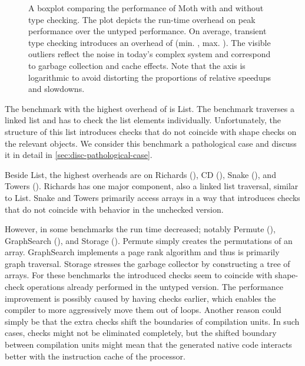 \begin{figure}[htb]
  \centering
	\TypingOverhead{}
	\caption{A boxplot comparing the performance of Moth
  with and without type checking.
  The plot depicts the run-time overhead on peak performance over
  the untyped performance. On average, transient type checking introduces
  an overhead of \OverheadTypingGMeanP (min. \OverheadTypingMinP, max. \OverheadTypingMaxP).
  The visible outliers reflect the noise in today's complex system
  and correspond \eg to garbage collection and cache effects.
  Note that the axis is logarithmic to avoid distorting the proportions
  of relative speedups and slowdowns.}
	\label{fig:typing-overhead}
\end{figure}


The benchmark with the highest overhead of \OverheadListP is List.
The benchmark traverses a linked list and
has to check the list elements individually.
Unfortunately, the structure of this list introduces checks
that do not coincide with shape checks on the relevant objects.
We consider this benchmark a pathological case and discuss it
in detail in \cref{sec:disc-pathological-case}.

Beside List, the highest overheads are on
Richards (\OverheadRichardsP), CD (\OverheadCDP), 
Snake (\OverheadSnakeP), and Towers (\OverheadTowersP).
Richards has one major component, also a linked list traversal,
similar to List.
Snake and Towers primarily access arrays in a way that introduces checks
that do not coincide with behavior in the unchecked version.


However, in some benchmarks the run time decreased; notably Permute (\OverheadPermuteP),
GraphSearch (\OverheadGraphSearchP), and Storage (\OverheadStorageP).
Permute simply creates the permutations of an array.
GraphSearch implements a page rank algorithm
and thus is primarily graph traversal.
Storage stresses the garbage collector by constructing a tree of arrays.
For these benchmarks the introduced checks seem to coincide with shape-check operations
already performed in the untyped version.
The performance improvement is possibly caused by having checks earlier,
which enables the compiler to more aggressively move them out of loops.
Another reason could simply be that the extra checks shift the boundaries
of compilation units.
In such cases, checks might not be eliminated completely,
but the shifted boundary between compilation units might mean that
the generated native code interacts better with
the instruction cache of the processor.

